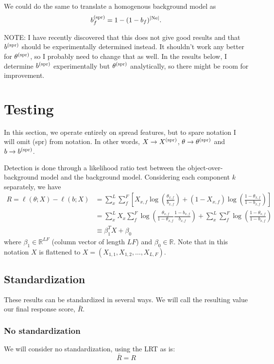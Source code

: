 \documentclass{article}
\begin{document}
We could do the same to translate a homogenous background model as
\[
    b^{\text{(spr)}}_f = 1 - (1 - b_f)^{|\text{Ne}|}.
\]

\noindent
NOTE: I have recently discovered that this does not give good results and that $b^{\text{(spr)}}$ should be experimentally determined instead. It shouldn't work any better for $\theta^{\text{(spr)}}$, so I probably need to change that as well. In the results below, I determine $b^{\text{(spr)}}$ experimentally but $\theta^{\text{(spr)}}$ analytically, so there might be room for improvement.


\section{Testing}
In this section, we operate entirely on spread features, but to spare notation I will omit (spr) from notation. In other words, $X \rightarrow X^{\text{(spr)}}$, $\theta \rightarrow \theta^{\text{(spr)}}$ and $b \rightarrow b^{\text{(spr)}}$.

Detection is done through a likelihood ratio test between the object-over-background model and the background model. Considering each component $k$ separately, we have
\begin{align*}
    R = \ell(\theta; X) - \ell(b; X) &= \sum_x^L \sum_f^F \left[ X_{x,f} \log \left(\frac{\theta_{x,f}}{b_{x,f}}\right) + (1 - X_{x,f})\log\left( \frac{1 - \theta_{x,f}}{1 - b_{x,f}}\right)\right] \\
    &= \sum_x^L X_x \sum_f^F \log \left(\frac{\theta_{x,f}}{1-\theta_{x,f}} \frac{1 - b_{x,f}}{b_{x,f}}\right) + \sum_x^L \sum_f^F \log\left(\frac{1 - \theta_{x,f}}{1 - b_{x,f}}\right) \\
    &\equiv \beta_1^T X + \beta_0 
\end{align*}
where $\beta_1 \in \mathbb{R}^{LF}$ (column vector of length $LF$) and $\beta_0 \in \mathbb{R}$. Note that in this notation $X$ is flattened to $X = (X_{1,1}, X_{1,2}, \dots, X_{L,F})$. 

\subsection{Standardization}

These results can be standardized in several ways. We will call the resulting value our final response score, $\bar R$.

\subsubsection{No standardization}
We will consider no standardization, using the LRT as is:
\[
    \bar R = R 
\]
\end{document}
